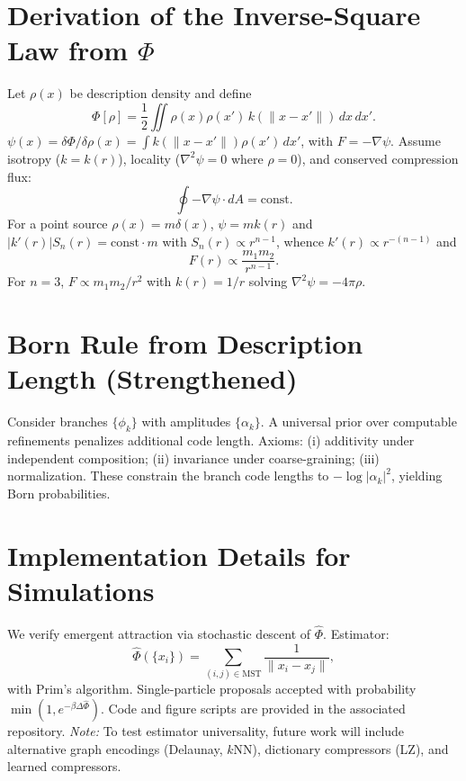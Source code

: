 \documentclass[aps,preprint,onecolumn,longbibliography,nofootinbib]{revtex4-2}
\numberwithin{equation}{section}
\begin{document}
\appendix

\section{Derivation of the Inverse-Square Law from $\Phi$}\label{app:A}
Let $\rho(x)$ be description density and define
\begin{equation}
\Phi[\rho] = \frac{1}{2}\iint \rho(x)\rho(x')\,k(\|x-x'\|)\,dx\,dx'. \label{eq:A1}
\end{equation}
$\psi(x)=\delta\Phi/\delta\rho(x)=\int k(\|x-x'\|)\rho(x')\,dx'$, with $F=-\nabla\psi$. Assume isotropy ($k=k(r)$), locality ($\nabla^2\psi=0$ where $\rho=0$), and conserved compression flux:
\begin{equation}
\oint -\nabla\psi \cdot dA = \text{const}. \label{eq:Aflux}
\end{equation}
For a point source $\rho(x)=m\delta(x)$, $\psi=mk(r)$ and $|k'(r)|S_n(r)=\text{const}\cdot m$ with $S_n(r)\propto r^{n-1}$, whence $k'(r)\propto r^{-(n-1)}$ and
\begin{equation}
F(r) \propto \frac{m_1 m_2}{r^{n-1}}. \label{eq:An}
\end{equation}
For $n=3$, $F\propto m_1m_2/r^2$ with $k(r)=1/r$ solving $\nabla^2\psi=-4\pi\rho$.

\section{Born Rule from Description Length (Strengthened)}\label{app:B}
Consider branches $\{\phi_k\}$ with amplitudes $\{\alpha_k\}$. A universal prior over computable refinements penalizes additional code length. Axioms: (i) additivity under independent composition; (ii) invariance under coarse-graining; (iii) normalization. These constrain the branch code lengths to $-\log|\alpha_k|^2$, yielding Born probabilities.

\section{Implementation Details for Simulations}\label{app:D}
We verify emergent attraction via stochastic descent of $\widehat{\Phi}$. Estimator:
\begin{equation}
\widehat{\Phi}(\{x_i\}) = \sum_{(i,j)\in \mathrm{MST}} \frac{1}{\|x_i - x_j\|}, \label{eq:D1}
\end{equation}
with Prim’s algorithm. Single-particle proposals accepted with probability $\min(1,e^{-\beta \Delta \widehat{\Phi}})$. Code and figure scripts are provided in the associated repository. \emph{Note:} To test estimator universality, future work will include alternative graph encodings (Delaunay, $k$NN), dictionary compressors (LZ), and learned compressors.
\end{document}
